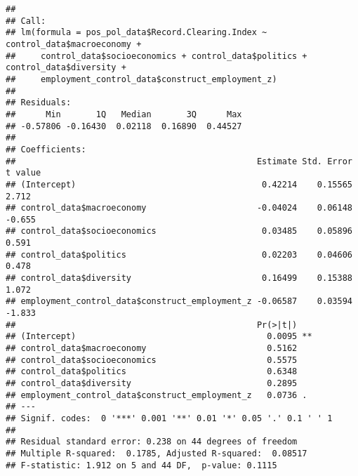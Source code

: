 \documentclass[
]{article}
\newenvironment{Shaded}{\begin{snugshade}}{\end{snugshade}}
\newcommand{\CommentTok}[1]{\textcolor[rgb]{0.56,0.35,0.01}{\textit{#1}}}
\newcommand{\FunctionTok}[1]{\textcolor[rgb]{0.13,0.29,0.53}{\textbf{#1}}}
\newcommand{\NormalTok}[1]{#1}
\newcommand{\OtherTok}[1]{\textcolor[rgb]{0.56,0.35,0.01}{#1}}
\newcommand{\SpecialCharTok}[1]{\textcolor[rgb]{0.81,0.36,0.00}{\textbf{#1}}}
\begin{document}
\begin{Shaded}
\end{Shaded}

\begin{verbatim}
## 
## Call:
## lm(formula = pos_pol_data$Record.Clearing.Index ~ control_data$macroeconomy + 
##     control_data$socioeconomics + control_data$politics + control_data$diversity + 
##     employment_control_data$construct_employment_z)
## 
## Residuals:
##      Min       1Q   Median       3Q      Max 
## -0.57806 -0.16430  0.02118  0.16890  0.44527 
## 
## Coefficients:
##                                                Estimate Std. Error t value
## (Intercept)                                     0.42214    0.15565   2.712
## control_data$macroeconomy                      -0.04024    0.06148  -0.655
## control_data$socioeconomics                     0.03485    0.05896   0.591
## control_data$politics                           0.02203    0.04606   0.478
## control_data$diversity                          0.16499    0.15388   1.072
## employment_control_data$construct_employment_z -0.06587    0.03594  -1.833
##                                                Pr(>|t|)   
## (Intercept)                                      0.0095 **
## control_data$macroeconomy                        0.5162   
## control_data$socioeconomics                      0.5575   
## control_data$politics                            0.6348   
## control_data$diversity                           0.2895   
## employment_control_data$construct_employment_z   0.0736 . 
## ---
## Signif. codes:  0 '***' 0.001 '**' 0.01 '*' 0.05 '.' 0.1 ' ' 1
## 
## Residual standard error: 0.238 on 44 degrees of freedom
## Multiple R-squared:  0.1785, Adjusted R-squared:  0.08517 
## F-statistic: 1.912 on 5 and 44 DF,  p-value: 0.1115
\end{verbatim}
\end{document}
